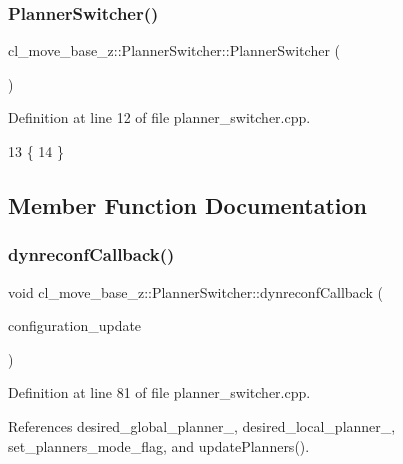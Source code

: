 \subsubsection{\texorpdfstring{Planner\+Switcher()}{PlannerSwitcher()}}
{\footnotesize\ttfamily cl\+\_\+move\+\_\+base\+\_\+z\+::\+Planner\+Switcher\+::\+Planner\+Switcher (\begin{DoxyParamCaption}{ }\end{DoxyParamCaption})}



Definition at line 12 of file planner\+\_\+switcher.\+cpp.


\begin{DoxyCode}
13 \{
14 \}
\end{DoxyCode}


\subsection{Member Function Documentation}
\mbox{\label{classcl__move__base__z_1_1PlannerSwitcher_ad9371bd8d62600ef874e8914c3ec177b}} 
\subsubsection{\texorpdfstring{dynreconf\+Callback()}{dynreconfCallback()}}
{\footnotesize\ttfamily void cl\+\_\+move\+\_\+base\+\_\+z\+::\+Planner\+Switcher\+::dynreconf\+Callback (\begin{DoxyParamCaption}\item[{const dynamic\+\_\+reconfigure\+::\+Config\+::\+Const\+Ptr \&}]{configuration\+\_\+update }\end{DoxyParamCaption})\hspace{0.3cm}{\ttfamily [private]}}



Definition at line 81 of file planner\+\_\+switcher.\+cpp.



References desired\+\_\+global\+\_\+planner\+\_\+, desired\+\_\+local\+\_\+planner\+\_\+, set\+\_\+planners\+\_\+mode\+\_\+flag, and update\+Planners().



